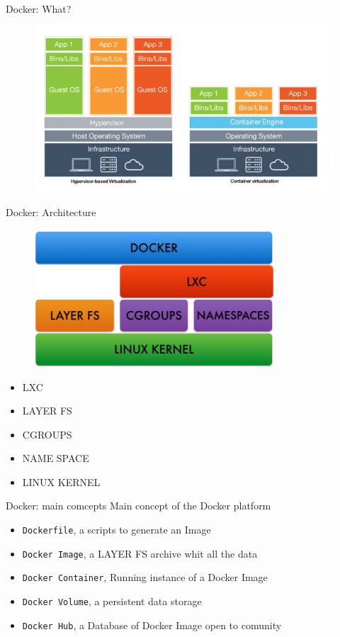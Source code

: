 \documentclass{beamer}
\begin{document}
  \begin{frame}{Docker: What?}
    \begin{figure}
      \includegraphics[width=1\textwidth]{img/docker_vs_vm.png}
    \end{figure}
  \end{frame}

  \begin{frame}{Docker: Architecture}
    \begin{figure}
      \includegraphics[width=0.8\textwidth]{img/docker_achitecture_crop.png}
    \end{figure}
    \begin{itemize}
      \item LXC %
      \item LAYER FS
      \item CGROUPS
      \item NAME SPACE
      \item LINUX KERNEL
    \end{itemize}
  \end{frame}

  \begin{frame}{Docker: main comcepts}
    Main concept of the Docker platform
    \begin{itemize}
      \item \texttt{Dockerfile}, a scripts to generate an Image
      \item \texttt{Docker Image}, a LAYER FS archive whit all the data
      \item \texttt{Docker Container}, Running instance of a Docker Image
      \item \texttt{Docker Volume}, a persistent data storage
      \item \texttt{Docker Hub}, a Database of Docker Image open to comunity
    \end{itemize}
  \end{frame}
\end{document}
